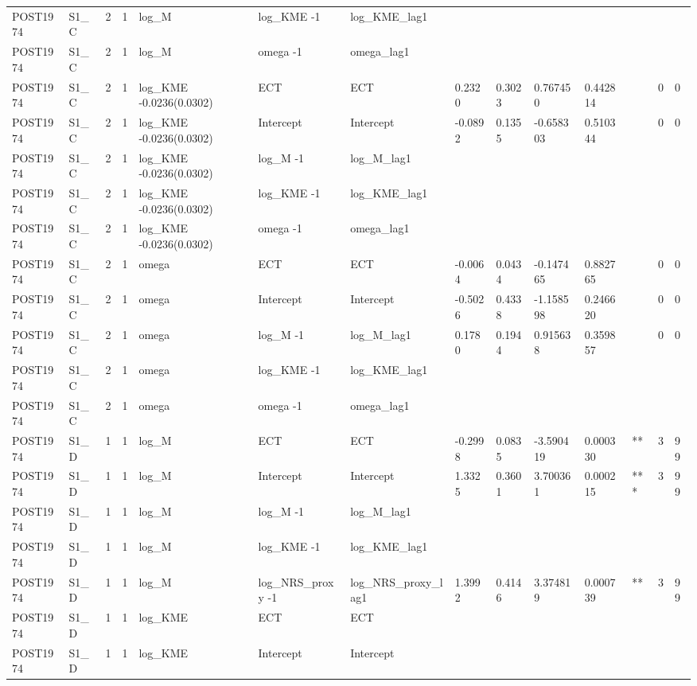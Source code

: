 \begin{tabular}{llllllllllllll}
POST1974 & S1\_C & 2 & 1 & log\_M & log\_KME -1 & log\_KME\_lag1 &  &  &  &  &  &  &  \\
POST1974 & S1\_C & 2 & 1 & log\_M & omega -1 & omega\_lag1 &  &  &  &  &  &  &  \\
POST1974 & S1\_C & 2 & 1 & log\_KME -0.0236(0.0302) & ECT & ECT & 0.2320 & 0.3023 & 0.767450 & 0.442814 &  & 0 & 0 \\
POST1974 & S1\_C & 2 & 1 & log\_KME -0.0236(0.0302) & Intercept & Intercept & -0.0892 & 0.1355 & -0.658303 & 0.510344 &  & 0 & 0 \\
POST1974 & S1\_C & 2 & 1 & log\_KME -0.0236(0.0302) & log\_M -1 & log\_M\_lag1 &  &  &  &  &  &  &  \\
POST1974 & S1\_C & 2 & 1 & log\_KME -0.0236(0.0302) & log\_KME -1 & log\_KME\_lag1 &  &  &  &  &  &  &  \\
POST1974 & S1\_C & 2 & 1 & log\_KME -0.0236(0.0302) & omega -1 & omega\_lag1 &  &  &  &  &  &  &  \\
POST1974 & S1\_C & 2 & 1 & omega & ECT & ECT & -0.0064 & 0.0434 & -0.147465 & 0.882765 &  & 0 & 0 \\
POST1974 & S1\_C & 2 & 1 & omega & Intercept & Intercept & -0.5026 & 0.4338 & -1.158598 & 0.246620 &  & 0 & 0 \\
POST1974 & S1\_C & 2 & 1 & omega & log\_M -1 & log\_M\_lag1 & 0.1780 & 0.1944 & 0.915638 & 0.359857 &  & 0 & 0 \\
POST1974 & S1\_C & 2 & 1 & omega & log\_KME -1 & log\_KME\_lag1 &  &  &  &  &  &  &  \\
POST1974 & S1\_C & 2 & 1 & omega & omega -1 & omega\_lag1 &  &  &  &  &  &  &  \\
POST1974 & S1\_D & 1 & 1 & log\_M & ECT & ECT & -0.2998 & 0.0835 & -3.590419 & 0.000330 & ** & 3 & 99 \\
POST1974 & S1\_D & 1 & 1 & log\_M & Intercept & Intercept & 1.3325 & 0.3601 & 3.700361 & 0.000215 & *** & 3 & 99 \\
POST1974 & S1\_D & 1 & 1 & log\_M & log\_M -1 & log\_M\_lag1 &  &  &  &  &  &  &  \\
POST1974 & S1\_D & 1 & 1 & log\_M & log\_KME -1 & log\_KME\_lag1 &  &  &  &  &  &  &  \\
POST1974 & S1\_D & 1 & 1 & log\_M & log\_NRS\_proxy -1 & log\_NRS\_proxy\_lag1 & 1.3992 & 0.4146 & 3.374819 & 0.000739 & ** & 3 & 99 \\
POST1974 & S1\_D & 1 & 1 & log\_KME & ECT & ECT &  &  &  &  &  &  &  \\
POST1974 & S1\_D & 1 & 1 & log\_KME & Intercept & Intercept &  &  &  &  &  &  &  \\

\end{tabular}
